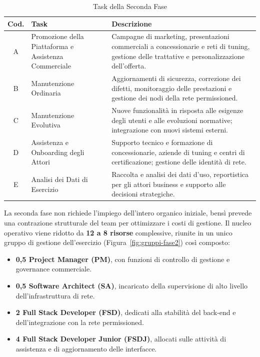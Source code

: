 \begin{table}[H]
\centering
\small
\begin{tabular}{cp{4cm}p{7.5cm}}
\hline
\textbf{Cod.} & \textbf{Task} & \textbf{Descrizione} \\
\hline
A & Promozione della Piattaforma e Assistenza Commerciale & Campagne di marketing, presentazioni commerciali a concessionarie e reti di tuning, gestione delle trattative e personalizzazione dell'offerta. \\
B & Manutenzione Ordinaria & Aggiornamenti di sicurezza, correzione dei difetti, monitoraggio delle prestazioni e gestione dei nodi della rete permissioned. \\
C & Manutenzione Evolutiva & Nuove funzionalità in risposta alle esigenze degli utenti e alle evoluzioni normative; integrazione con nuovi sistemi esterni. \\
D & Assistenza e Onboarding degli Attori & Supporto tecnico e formazione di concessionarie, aziende di tuning e centri di certificazione; gestione delle identità di rete. \\
E & Analisi dei Dati di Esercizio & Raccolta e analisi dei dati d'uso, reportistica per gli attori business e supporto alle decisioni strategiche. \\
\hline
\end{tabular}
\caption{Task della Seconda Fase}
\label{tab:task-fase2}
\end{table}

La seconda fase non richiede l'impiego dell'intero organico iniziale, bensì prevede una contrazione strutturale del team per ottimizzare i costi di gestione. Il nucleo operativo viene ridotto da \textbf{12 a 8 risorse} complessive, riunite in un unico gruppo di gestione dell'esercizio (Figura~\ref{fig:gruppi-fase2}) così composto:

\begin{itemize}
    \item \textbf{0,5 Project Manager (PM)}, con funzioni di controllo di gestione e governance commerciale.
    \item \textbf{0,5 Software Architect (SA)}, incaricato della supervisione di alto livello dell'infrastruttura di rete.
    \item \textbf{2 Full Stack Developer (FSD)}, dedicati alla stabilità del back-end e dell'integrazione con la rete permissioned.
    \item \textbf{4 Full Stack Developer Junior (FSDJ)}, allocati sulle attività di assistenza e di aggiornamento delle interfacce.
\end{itemize}

